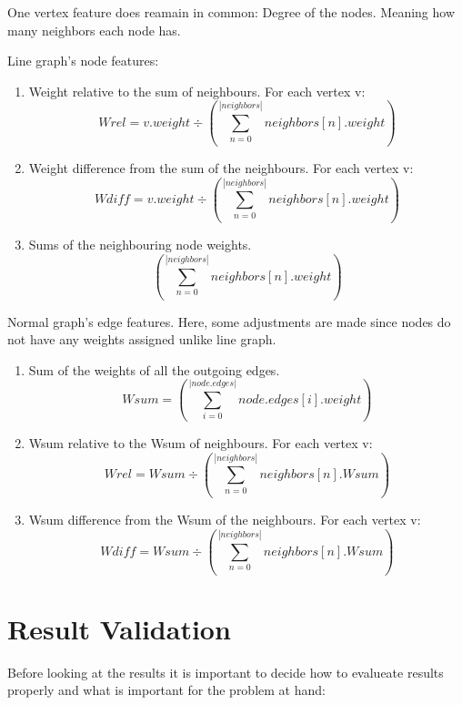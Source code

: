 One vertex feature does reamain in common: Degree of the nodes. Meaning how many neighbors each node has.

Line graph's node features:  

\begin{enumerate}
\item Weight relative to the sum of neighbours. For each vertex v:  \[ Wrel = v.weight  \div  (\sum_{n=0}^{|neighbors|} neighbors[n].weight) \]
\item Weight difference from the sum of the neighbours. For each vertex v:  \[ Wdiff = v.weight  \div  (\sum_{n=0}^{|neighbors|} neighbors[n].weight) \]
\item Sums of the neighbouring node weights. \[ (\sum_{n=0}^{|neighbors|} neighbors[n].weight) \]
\end{enumerate}

Normal graph's edge features. Here, some adjustments are made since nodes do not have any weights assigned unlike line graph.

\begin{enumerate}
\item Sum of the weights of all the outgoing edges.  \[ Wsum = (\sum_{i=0}^{|node.edges|} node.edges[i].weight) \]
\item Wsum relative to the Wsum of neighbours. For each vertex v:  \[ Wrel = Wsum \div (\sum_{n=0}^{|neighbors|} neighbors[n].Wsum) \]
\item Wsum difference from the Wsum of the neighbours. For each vertex v: \[ Wdiff = Wsum \div (\sum_{n=0}^{|neighbors|} neighbors[n].Wsum) \]
\end{enumerate}

\section{Result Validation}

Before looking at the results it is important to decide how to evalueate results properly and what is important for the problem at hand:

